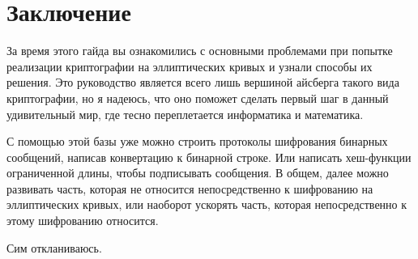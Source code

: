 
\section{Заключение}
За время этого гайда вы ознакомились с основными проблемами при попытке реализации криптографии на эллиптических кривых и узнали способы их решения. Это руководство является всего лишь вершиной айсберга такого вида криптографии, но я надеюсь, что оно поможет сделать первый шаг в данный удивительный мир, где тесно переплетается информатика и математика.

С помощью этой базы уже можно строить протоколы шифрования бинарных сообщений, написав конвертацию к бинарной строке. Или написать хеш-функции ограниченной длины, чтобы подписывать сообщения. В общем, далее можно развивать часть, которая не относится непосредственно к шифрованию на эллиптических кривых, или наоборот ускорять часть, которая непосредственно к этому шифрованию относится.

Сим откланиваюсь.

